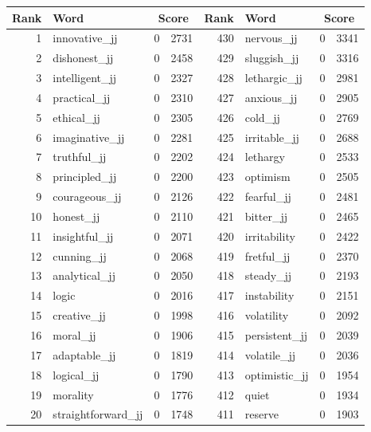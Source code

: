 \begin{table}[tbp]
    \begin{tabular}{| rlr@{.}l | rlr@{.}l |}
    \hline
    \textbf{Rank} & \textbf{Word} & \multicolumn{2}{c|}{\textbf{Score}} & \textbf{Rank} & \textbf{Word} & \multicolumn{2}{c|}{\textbf{Score}} \\
    \hline
    1 & innovative\_jj & 0 & 2731    &    430 & nervous\_jj & 0 & 3341 \\
    2 & dishonest\_jj & 0 & 2458    &    429 & sluggish\_jj & 0 & 3316 \\
    3 & intelligent\_jj & 0 & 2327    &    428 & lethargic\_jj & 0 & 2981 \\
    4 & practical\_jj & 0 & 2310    &    427 & anxious\_jj & 0 & 2905 \\
    5 & ethical\_jj & 0 & 2305    &    426 & cold\_jj & 0 & 2769 \\
    6 & imaginative\_jj & 0 & 2281    &    425 & irritable\_jj & 0 & 2688 \\
    7 & truthful\_jj & 0 & 2202    &    424 & lethargy & 0 & 2533 \\
    8 & principled\_jj & 0 & 2200    &    423 & optimism & 0 & 2505 \\
    9 & courageous\_jj & 0 & 2126    &    422 & fearful\_jj & 0 & 2481 \\
    10 & honest\_jj & 0 & 2110    &    421 & bitter\_jj & 0 & 2465 \\
    11 & insightful\_jj & 0 & 2071    &    420 & irritability & 0 & 2422 \\
    12 & cunning\_jj & 0 & 2068    &    419 & fretful\_jj & 0 & 2370 \\
    13 & analytical\_jj & 0 & 2050    &    418 & steady\_jj & 0 & 2193 \\
    14 & logic & 0 & 2016    &    417 & instability & 0 & 2151 \\
    15 & creative\_jj & 0 & 1998    &    416 & volatility & 0 & 2092 \\
    16 & moral\_jj & 0 & 1906    &    415 & persistent\_jj & 0 & 2039 \\
    17 & adaptable\_jj & 0 & 1819    &    414 & volatile\_jj & 0 & 2036 \\
    18 & logical\_jj & 0 & 1790    &    413 & optimistic\_jj & 0 & 1954 \\
    19 & morality & 0 & 1776    &    412 & quiet & 0 & 1934 \\
    20 & straightforward\_jj & 0 & 1748    &    411 & reserve & 0 & 1903 \\

\end{tabular}
\end{table}
